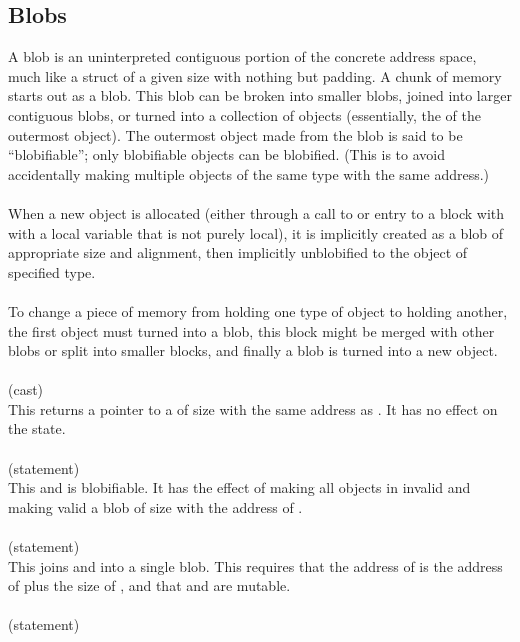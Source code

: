 \documentclass[preprint,nocopyrightspace]{sigplanconf}
\begin{document}
{{{\subsection{Blobs}
A blob is an uninterpreted contiguous portion of the concrete address
space, much like a struct of a given size with nothing but padding. 
A chunk of memory starts out as a blob. This blob can be broken into
smaller blobs, joined into larger contiguous blobs, or turned into a
collection of objects (essentially, the  of the outermost
object). The outermost object made from the blob is said to be
``blobifiable''; only blobifiable objects can be blobified. (This is
to avoid accidentally making multiple objects of the same type with
the same address.) 
\\\\
When a new object is allocated (either through a call to  or
entry to a block with with a local variable that is not purely local),
it is implicitly created as a blob of appropriate size and alignment,
then implicitly unblobified to the object of specified type.
\\\\
To change a piece of memory from holding one type of object to holding
another, the first object must turned into a blob, this block might be 
merged with other blobs or split into smaller blocks, and finally a blob
is turned into a new object. 
\\\\
 (cast)\\
This returns a pointer to a  of size  with the same
address as . It has no effect on the state. 
\\\\
 (statement)\\
This    and
 is blobifiable. It has the effect of making all
objects in  invalid and making valid a blob of
size  with the address of .
\\\\ 
 (statement)\\
This joins  and  into a single blob. This requires that
the address of  is the address of  plus the size
of , and that  and  are mutable.
\\\\
 (statement)\\
}}}
\end{document}
